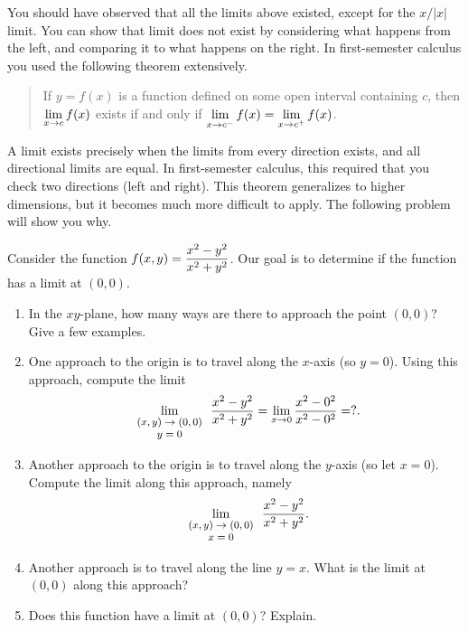 You should have observed that all the limits above existed, except for the $x/|x|$ limit.  You can show that limit does not exist by considering what happens from the left, and comparing it to what happens on the right.  In first-semester calculus you used the following theorem extensively. 
\begin{quote}
 If $y=f(x)$ is a function defined on some open interval containing $c$, then $\displaystyle\lim_{x\to c}f(x)$ exists if and only if  $\displaystyle\lim_{x\to c^-}f(x) = \displaystyle\lim_{x\to c^+}f(x)$.
\end{quote}
 A limit exists precisely when the limits from every direction exists, and all directional limits are equal. In first-semester calculus, this required that you check two directions (left and right). This theorem generalizes to higher dimensions, but it becomes much more difficult to apply. The following problem will show you why.
\begin{problem}
 Consider the function $\displaystyle f(x,y)=\frac{x^2-y^2}{x^2+y^2}$.
Our goal is to determine if the function has a limit at $(0,0)$.
\begin{enumerate}
 \item In the $xy$-plane, how many ways are there to approach the point $(0,0)$? Give a few examples.
 \item One approach to the origin is to travel along the $x$-axis (so $y=0$). Using this approach, compute the limit 
$$\displaystyle\lim_{\text{\footnotesize $\begin{array}{c}(x,y)\to(0,0)\\ y=0\end{array}$}}\frac{x^2-y^2}{x^2+y^2} = \lim_{x\to 0} \frac{x^2-0^2}{x^2-0^2}=?.$$
 \item Another approach to the origin is to travel along the $y$-axis (so let $x=0$). Compute the limit along this approach, namely 
$$\displaystyle\lim_{\text{\footnotesize $\begin{array}{c}(x,y)\to(0,0)\\ x=0\end{array}$}}\frac{x^2-y^2}{x^2+y^2}.$$
 \item Another approach is to travel along the line $y=x$.  What is the limit at $(0,0)$ along this approach?
 \item Does this function have a limit at $(0,0)$? Explain. %
\end{enumerate}
\end{problem}

